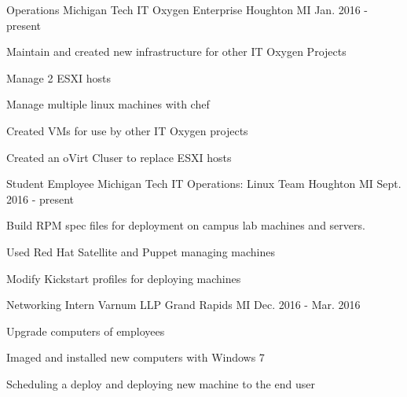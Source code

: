 

\begin{cventries}

  \cventry
    {Operations} %
    {Michigan Tech IT Oxygen Enterprise} %
    {Houghton MI} %
    {Jan. 2016 - present} %
    {
      \begin{cvitems} %
        \item {Maintain and created new infrastructure for other IT Oxygen Projects}
        \item {Manage 2 ESXI hosts}
        \item {Manage multiple linux machines with chef}
        \item {Created VMs for use by other IT Oxygen projects}
	\item {Created an oVirt Cluser to replace ESXI hosts}
      \end{cvitems}
    }

  \cventry
    {Student Employee} %
    {Michigan Tech IT Operations: Linux Team} %
    {Houghton MI} %
    {Sept. 2016 - present} %
    {
      \begin{cvitems} %
        \item {Build RPM spec files for deployment on campus lab machines and servers.}
        \item {Used Red Hat Satellite and Puppet managing machines}
        \item {Modify Kickstart profiles for deploying machines}
      \end{cvitems}
    }

  \cventry
    {Networking Intern} %
    {Varnum LLP} %
    {Grand Rapids MI} %
    {Dec. 2016 - Mar. 2016} %
    {
      \begin{cvitems} %
        \item {Upgrade computers of employees}
        \item {Imaged and installed new computers with Windows 7}
        \item {Scheduling a deploy and deploying new machine to the end user}
      \end{cvitems}
    }


\end{cventries}
